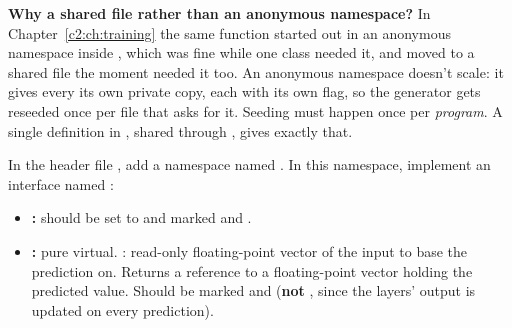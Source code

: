 \textbf{Why a shared file rather than an anonymous namespace?} In Chapter~\ref{c2:ch:training} the
same function started out in an anonymous namespace inside , which was fine while
one class needed it, and moved to a shared file the moment  needed it too. An
anonymous namespace doesn't scale: it gives every  its own private copy, each with its
own  flag, so the generator gets reseeded once per file that asks for it.
Seeding must happen once per \emph{program}. A single definition in , shared
through , gives exactly that.

\label{c4:ex:3}
In the header file , add a namespace named
. In this namespace, implement an interface named :
\begin{itemize}
  \item \textbf{:} should be set to  and marked  and
    .
  \item \textbf{:} pure virtual. : read-only floating-point vector
    of the input to base the prediction on. Returns a reference to a floating-point vector holding
    the predicted value. Should be marked \code{[[nodiscard]]} and  (\textbf{not}
    , since the layers' output is updated on every prediction).
\end{itemize}

